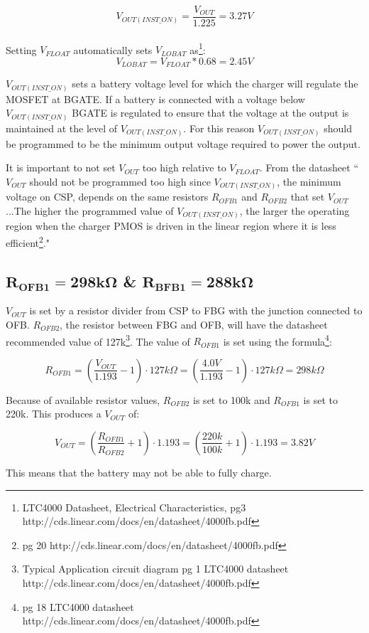 \documentclass{article}
\begin{document}
\[V_{OUT(INST\_ON)} = \frac{V_{OUT}}{1.225} = 3.27V\]\\
Setting $V_{FLOAT}$ automatically sets $V_{LOBAT}$  as\footnote{LTC4000 Datasheet, Electrical Characteristics, pg3 http://cds.linear.com/docs/en/datasheet/4000fb.pdf}:
\[V_{LOBAT} = V_{FLOAT}*0.68 = 2.45V\]

$V_{OUT(INST\_ON)}$ sets a battery voltage level for which the charger will regulate the MOSFET at BGATE. If a battery is connected with a voltage below $V_{OUT(INST\_ON)}$ BGATE is regulated to ensure that the voltage at the output is maintained at the level of $V_{OUT(INST\_ON)}$. For this reason $V_{OUT(INST\_ON)}$ should be programmed to be the minimum output voltage required to power the output.

It is important to not set $V_{OUT}$ too high relative to $V_{FLOAT}$. From the datasheet ``$V_{OUT}$ should not be programmed too high since $V_{OUT(INST\_ON)}$, the minimum 
voltage on CSP, depends on the same resistors $R_{OFB1}$ and 
$R_{OFB2}$ that set $V_{OUT}$...The higher the programmed value of 
$V_{OUT(INST\_ON)}$, the larger the operating region when the 
charger PMOS is driven in the linear region where it is 
less efficient\footnote{pg 20 http://cds.linear.com/docs/en/datasheet/4000fb.pdf}." 


\subsection{$\mathbf{R_{OFB1} = 298k\Omega}$ \& $\mathbf{R_{BFB1}=288k\Omega}$}
$V_{OUT}$ is set by a resistor divider from CSP to FBG with the junction connected to OFB. $R_{OFB2}$, the resistor between FBG and OFB, will have the datasheet recommended value of 127k\footnote{Typical Application circuit diagram pg 1 LTC4000 datasheet http://cds.linear.com/docs/en/datasheet/4000fb.pdf}. The value of $R_{OFB1}$ is set using the formula\footnote{pg 18 LTC4000 datasheet http://cds.linear.com/docs/en/datasheet/4000fb.pdf}:

\[R_{OFB1} = \left ( \frac{V_{OUT}}{1.193} - 1 \right)  \cdot 127k\Omega=\left ( \frac{4.0V}{1.193} - 1 \right)\cdot 127k\Omega = 298k\Omega\]

Because of available resistor values, $R_{OFB2}$ is set to 100k and $R_{OFB1}$ is set to 220k. This produces a $V_{OUT}$ of:

\[V_{OUT} = \left ( \frac{R_{OFB1}}{R_{OFB2}}+1 \right ) \cdot 1.193 = \left ( \frac{220k}{100k}+1 \right ) \cdot 1.193 = 3.82V\]

This means that the battery may not be able to fully charge. 
\end{document}
